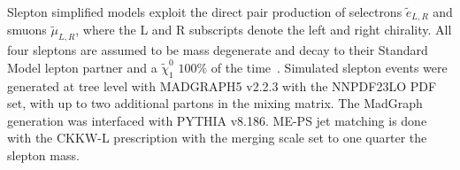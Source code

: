  \iffalse
   \begin{figure}[tbp]
     \texttt{[image: /Users/sheenaschier/Documents/LaFiles/figures/thesis/signal\_samples/ossf\_MET.pdf]}      
      \texttt{[image: /Users/sheenaschier/Documents/LaFiles/figures/thesis/signal\_samples/ossf\_dphi\_j1met.pdf]}
     \texttt{[image: /Users/sheenaschier/Documents/LaFiles/figures/thesis/signal\_samples/ossf\_Jet1Pt.pdf]}
\caption{Jet and \met{} kinematics in electroweakino signal samples, with decays simulated with MadSpin and parton showing performed by Pythia v8.186.}
   \label{fig:SigSample2}
 \end{figure}
 \fi

 
Slepton simplified models exploit the direct pair production of selectrons $\tilde{e}_{L,R}$ and smuons $\tilde{\mu}_{L,R}$, where the L and R subscripts denote the left and right chirality.  All four sleptons are assumed to be mass degenerate and decay to their Standard Model lepton partner and a $\tilde\chi_1^0$ $100\%$ of the time~\cite{Ajaib:2015yma}.  Simulated slepton events were generated at tree level with MADGRAPH5 v2.2.3 with the NNPDF23LO PDF set, with up to two additional partons in the mixing matrix.  The MadGraph generation was interfaced with PYTHIA v8.186.  ME-PS jet matching is done with the CKKW-L prescription with the merging scale set to one quarter the slepton mass.
 \FloatBarrier

 \iffalse
\begin{figure}[tbp]
    \centering
 \texttt{[image: /Users/sheenaschier/Documents/LaFiles/figures/thesis/signal\_samples/mll\_theory.pdf]}
 \caption{Dilepton invariant mass distributions simulated with Higgsino (blue) and wino/bino (red) simplified models.  In both models, $m(\chi_2^0, \chi_1^0$ = ($100, 80$) GeV.}
\label{fig:samples:invMass}
\end{figure}
\fi
 \FloatBarrier
 
